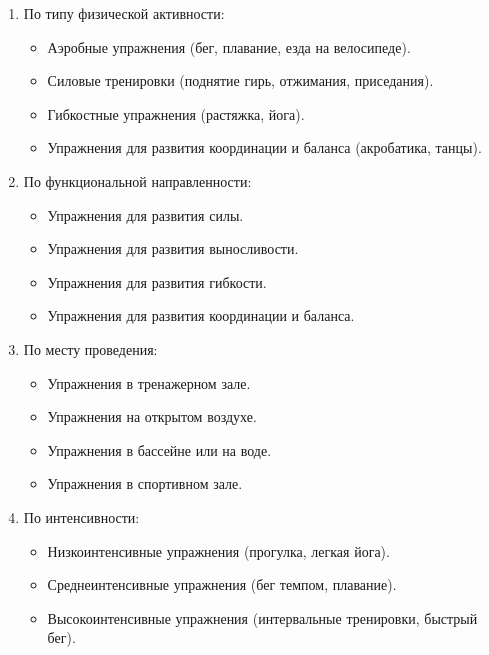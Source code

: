 \begin{enumerate}
    \item По типу физической активности:
          \begin{itemize}
              \item Аэробные упражнения (бег, плавание, езда на велосипеде).
              \item Силовые тренировки (поднятие гирь, отжимания, приседания).
              \item Гибкостные упражнения (растяжка, йога).
              \item Упражнения для развития координации и баланса (акробатика, танцы).
          \end{itemize}

    \item По функциональной направленности:
          \begin{itemize}
              \item Упражнения для развития силы.
              \item Упражнения для развития выносливости.
              \item Упражнения для развития гибкости.
              \item Упражнения для развития координации и баланса.
          \end{itemize}

    \item По месту проведения:
          \begin{itemize}
              \item Упражнения в тренажерном зале.
              \item Упражнения на открытом воздухе.
              \item Упражнения в бассейне или на воде.
              \item Упражнения в спортивном зале.
          \end{itemize}

    \item По интенсивности:
          \begin{itemize}
              \item Низкоинтенсивные упражнения (прогулка, легкая йога).
              \item Среднеинтенсивные упражнения (бег темпом, плавание).
              \item Высокоинтенсивные упражнения (интервальные тренировки, быстрый бег).
          \end{itemize}


\end{enumerate}
